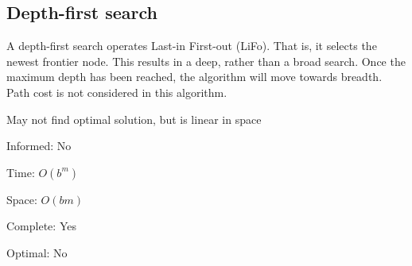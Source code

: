 
\subsection{Depth-first search}

A depth-first search operates Last-in First-out (LiFo). That is, it selects the newest frontier node. This results in a deep, rather than a broad search. Once the maximum depth has been reached, the algorithm will move towards breadth. Path cost is not considered in this algorithm.

May not find optimal solution, but is linear in space

Informed: No

Time: \(O(b^m)\)

Space: \(O(bm)\)

Complete: Yes

Optimal: No

